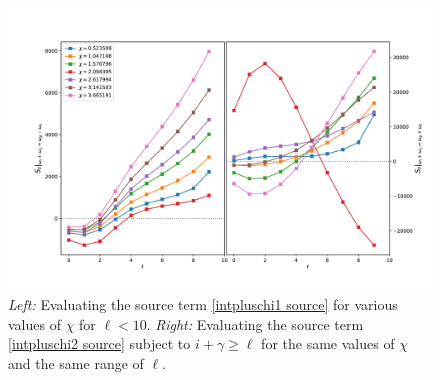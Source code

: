 \documentclass[letterpaper,11pt]{article}
\begin{document}
\begin{figure}[t]
\centering
	\includegraphics[width=\textwidth]{./figures/IntPlusChi}
	\caption{{\it Left:} Evaluating the source term \eqref{intpluschi1 source} for various values of $\chi$ for $\ell < 10$. {\it Right:} Evaluating the source term \eqref{intpluschi2 source} subject to $i + \gamma \geq \ell$ for the same values of $\chi$ and the same range of $\ell$.}
	\label{fig: twoiplusx}
\end{figure}
\end{document}
